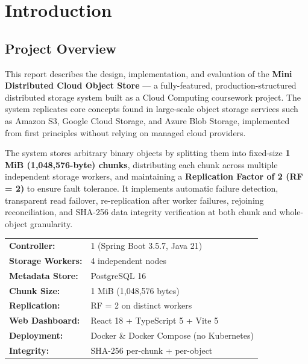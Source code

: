 \documentclass[12pt,a4paper]{report}
\begin{document}
\chapter{Introduction}

\section{Project Overview}

This report describes the design, implementation, and evaluation of the \textbf{Mini Distributed Cloud Object Store} --- a fully-featured, production-structured distributed storage system built as a Cloud Computing coursework project. The system replicates core concepts found in large-scale object storage services such as Amazon S3, Google Cloud Storage, and Azure Blob Storage, implemented from first principles without relying on managed cloud providers.

The system stores arbitrary binary objects by splitting them into fixed-size \textbf{1 MiB (1,048,576-byte) chunks}, distributing each chunk across multiple independent storage workers, and maintaining a \textbf{Replication Factor of 2 (RF = 2)} to ensure fault tolerance. It implements automatic failure detection, transparent read failover, re-replication after worker failures, rejoining reconciliation, and SHA-256 data integrity verification at both chunk and whole-object granularity.

\begin{infobox}
\begin{tabular}{ll}
\textbf{Controller:}       & 1 (Spring Boot 3.5.7, Java 21) \\
\textbf{Storage Workers:}  & 4 independent nodes \\
\textbf{Metadata Store:}   & PostgreSQL 16 \\
\textbf{Chunk Size:}       & 1 MiB (1,048,576 bytes) \\
\textbf{Replication:}      & RF = 2 on distinct workers \\
\textbf{Web Dashboard:}    & React 18 + TypeScript 5 + Vite 5 \\
\textbf{Deployment:}       & Docker \& Docker Compose (no Kubernetes) \\
\textbf{Integrity:}        & SHA-256 per-chunk + per-object \\
\end{tabular}
\end{infobox}
\end{document}
